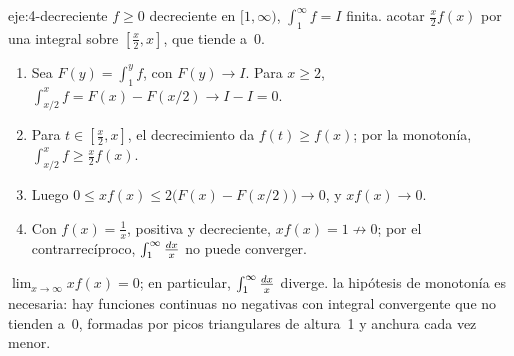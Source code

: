 \begin{solucion}{eje:4-decreciente}
\datos $f\ge0$ decreciente en $[1,\infty)$, $\int_1^{\infty}f=I$ finita.
\planteamiento acotar $\frac x2f(x)$ por una integral sobre $[\frac x2,x]$, que tiende a~$0$.
\pasos
\begin{enumerate}[label=\arabic*.]
  \item Sea $F(y)=\int_1^{y}f$, con $F(y)\to I$. Para $x\ge2$, $\int_{x/2}^{x}f=F(x)-F(x/2)\to I-I=0$.
  \item Para $t\in[\frac x2,x]$, el decrecimiento da $f(t)\ge f(x)$; por la monotonía, $\int_{x/2}^{x}f\ge\frac x2f(x)$.
  \item Luego $0\le xf(x)\le2\bigl(F(x)-F(x/2)\bigr)\to0$, y $xf(x)\to0$.
  \item Con $f(x)=\frac1x$, positiva y decreciente, $xf(x)=1\not\to0$; por el contrarrecíproco, $\int_1^{\infty}\frac{\mathop{}\!d x}{x}$ no puede converger.
\end{enumerate}
\resultado $\lim_{x\to\infty}xf(x)=0$; en particular, $\int_1^{\infty}\frac{\mathop{}\!d x}{x}$ diverge.
\comprobacion la hipótesis de monotonía es necesaria: hay funciones continuas no negativas con integral convergente que no tienden a~$0$, formadas por picos triangulares de altura~1 y anchura cada vez menor.
\end{solucion}

